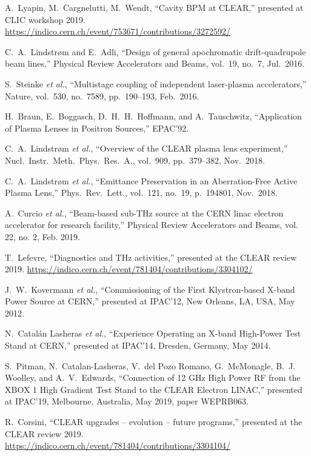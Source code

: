 \documentclass[a4paper,
               keeplastbox,   %
               ]{jacow}
\begin{document}
\begin{thebibliography}{99}
 A.\ Lyapin, M.\ Cargnelutti, M.\ Wendt, “Cavity BPM at CLEAR,” presented at CLIC workshop 2019. \url{https://indico.cern.ch/event/753671/contributions/3272592/}

 C.\ A.\ Lindstrøm and E.\ Adli, “Design of general apochromatic drift-quadrupole beam lines,” Physical Review Accelerators and Beams, vol.\ 19, no.\ 7, Jul.\ 2016.

 S.\ Steinke \emph{et al.}, “Multistage coupling of independent laser-plasma accelerators,” Nature, vol.\ 530, no.\ 7589, pp.\ 190--193, Feb.\ 2016.

 H.\ Braun, E.\ Boggasch, D.\ H.\ H.\ Hoffmann, and A.\ Tauschwitz, “Application of Plasma Lenses in Positron Sources,” EPAC'92.


 C.\ A.\ Lindstrøm \emph{et al.}, “Overview of the CLEAR plasma lens experiment,” Nucl.\ Instr.\ Meth.\ Phys.\ Res.\ A,, vol.\ 909, pp.\ 379--382, Nov.\ 2018.

 C.\ A.\ Lindstrøm \emph{et al.}, “Emittance Preservation in an Aberration-Free Active Plasma Lens,” Phys.\ Rev.\ Lett., vol.\ 121, no.\ 19, p.\ 194801, Nov.\ 2018.

 A.\ Curcio \emph{et al.}, “Beam-based sub-THz source at the CERN linac electron accelerator for research facility,” Physical Review Accelerators and Beams, vol. 22, no. 2, Feb. 2019.

 T.\ Lefevre, “Diagnostics and THz activities,” presented at the CLEAR review 2019. \url{https://indico.cern.ch/event/781404/contributions/3304102/}

 J.\ W.\ Kovermann \emph{et al.}, “Commissioning of the First Klystron-based X-band Power Source at CERN,” presented at IPAC’12, New Orleans, LA, USA, May 2012.

 N.\ Catalán Lasheras \emph{et al.}, “Experience Operating an X-band High-Power Test Stand at CERN,” presented at IPAC'14, Dresden, Germany, May 2014.

   S.\ Pitman, N.\ Catalan-Lasheras, V.\ del Pozo Romano, G.\ McMonagle, B.\ J. Woolley, and A.\ V.\ Edwards,
   “Connection of 12 GHz High Power RF from the XBOX 1 High Gradient Test Stand to the CLEAR Electron LINAC,”
   presented at IPAC'19, Melbourne, Australia, May 2019, paper WEPRB063.

 R.\ Corsini, “CLEAR upgrades -- evolution -- future programs,” presented at the CLEAR review 2019. \url{https://indico.cern.ch/event/781404/contributions/3304104/}

\end{thebibliography}
\end{document}
